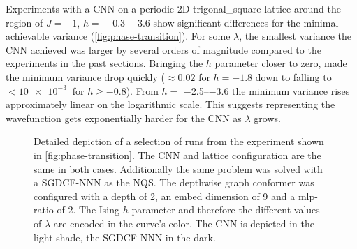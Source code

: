 Experiments with a CNN on a periodic 2D-trigonal\_square lattice around the region of $J = -1$, $h = $ \SIrange[]{-0.3}{-3.6}{} show significant differences for the minimal achievable variance (\autoref{fig:phase-transition}). 
For some $\lambda$, the smallest variance the CNN achieved was larger by several orders of magnitude compared to the experiments in the past sections.
Bringing the $h$ parameter closer to zero, made the minimum variance drop quickly ($\approx 0.02$ for $h = -1.8$ down to falling to $< \SI[]{10e-3}[]{}$ for $h \geq -0.8$).
From $h = $ \SIrange[]{-2.5}{-3.6}{} the minimum variance rises approximately linear on the logarithmic scale. 
This suggests representing the wavefunction gets exponentially harder for the CNN as $\lambda$ grows.

\begin{figure}[htbp]
    \centering
    \caption{Detailed depiction of a selection of runs from the experiment shown in \autoref{fig:phase-transition}.
        The CNN and lattice configuration are the same in both cases.
        Additionally the same problem was solved with a SGDCF-NNN as the NQS.
        The depthwise graph conformer was configured with a depth of 2, an embed dimension of 9 and a mlp-ratio of 2.
        The Ising $h$ parameter and therefore the different values of $\lambda$ are encoded in the curve's color. 
        The CNN is depicted in the light shade, the SGDCF-NNN in the dark.
    }
    \label{fig:performance-across-phase}
\end{figure}

